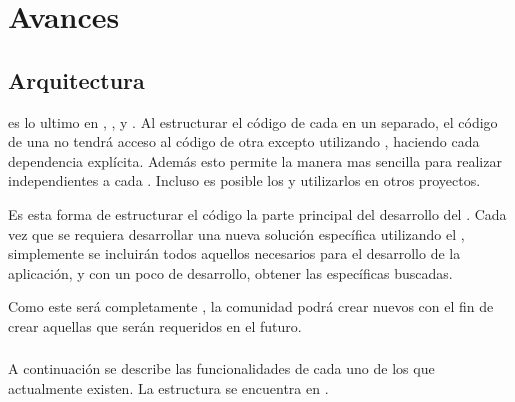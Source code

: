 
\chapter{Avances}

\section{Arquitectura}

\packagesAS es lo ultimo en \codeSeparationQA, \modularityAS, y \reusabilityQA. Al estructurar el código de cada \featureCPT en un \packagesAS separado, el código de una \featureCPT no tendrá acceso al código de otra \featureCPT excepto utilizando \exportCPT, haciendo cada dependencia explícita. Además esto permite la manera mas sencilla para realizar \testingCPT independientes a cada \featureCPT. Incluso es posible \publishINT los \packagesAS y utilizarlos en otros proyectos.

Es esta forma de estructurar el código la parte principal del desarrollo del \frameworkPC \ecommerce. Cada vez que se requiera desarrollar una nueva solución específica utilizando el \frameworkPC, simplemente se incluirán todos aquellos \modulesAS necesarios para el desarrollo de la aplicación, y con un poco de desarrollo, obtener las \featuresCPT específicas buscadas.

Como este \frameworkPC será completamente \openSourcePC, la comunidad podrá crear nuevos \modulesAS con el fin de crear aquellas \featuresCPT que serán requeridos en el futuro.



\subsection{\packagesAS}

A continuación se describe las funcionalidades de cada uno de los \packagesAS que actualmente existen. La estructura se encuentra en .

